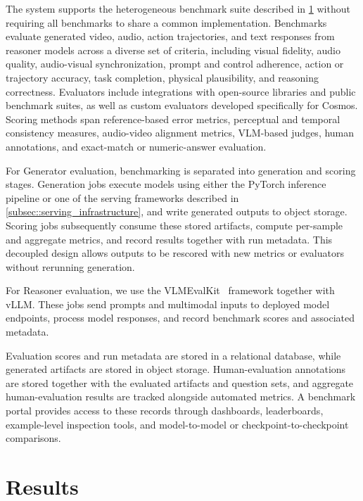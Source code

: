 \documentclass{llmxive}
\begin{document}
The system supports the heterogeneous benchmark suite described in \cref{sec::results} without requiring all benchmarks to share a common implementation. Benchmarks evaluate generated video, audio, action trajectories, and text responses from reasoner models across a diverse set of criteria, including visual fidelity, audio quality, audio-visual synchronization, prompt and control adherence, action or trajectory accuracy, task completion, physical plausibility, and reasoning correctness. Evaluators include integrations with open-source libraries and public benchmark suites, as well as custom evaluators developed specifically for Cosmos. Scoring methods span reference-based error metrics, perceptual and temporal consistency measures, audio-video alignment metrics, VLM-based judges, human annotations, and exact-match or numeric-answer evaluation.

For Generator evaluation, benchmarking is separated into generation and scoring stages. Generation jobs execute models using either the PyTorch inference pipeline or one of the serving frameworks described in \cref{subsec::serving_infrastructure}, and write generated outputs to object storage. Scoring jobs subsequently consume these stored artifacts, compute per-sample and aggregate metrics, and record results together with run metadata. This decoupled design allows outputs to be rescored with new metrics or evaluators without rerunning generation.

For Reasoner evaluation, we use the VLMEvalKit~\citep{duan2024vlmevalkit} framework together with vLLM. These jobs send prompts and multimodal inputs to deployed model endpoints, process model responses, and record benchmark scores and associated metadata.

Evaluation scores and run metadata are stored in a relational database, while generated artifacts are stored in object storage. Human-evaluation annotations are stored together with the evaluated artifacts and question sets, and aggregate human-evaluation results are tracked alongside automated metrics. A benchmark portal provides access to these records through dashboards, leaderboards, example-level inspection tools, and model-to-model or checkpoint-to-checkpoint comparisons.


\section{Results}
\label{sec::results}
\end{document}
